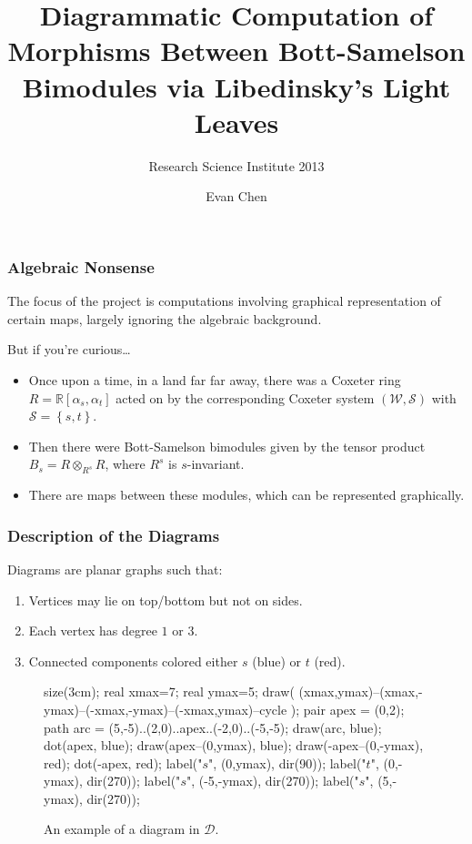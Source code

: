 \documentclass[pdf]{beamer}
\title[Maps in $\mathcal B_{\text{BS}}$]{Diagrammatic Computation of Morphisms Between Bott-Samelson Bimodules via Libedinsky's Light Leaves}
\subtitle[RSI 2013]{Research Science Institute 2013}
\author{Evan Chen}
\def\RR{\mathbb R}
\def\ZZ{\mathbb Z}
\def\ii{\item}
\theoremstyle{definition}
\def\DD{\mathcal D}
\begin{document}
\begin{frame}
	\maketitle
\end{frame}

\begin{frame}
	\frametitle{Algebraic Nonsense}
	The focus of the project is computations involving graphical representation of certain maps, largely \alert{ignoring the algebraic background}.
	\par
	But if you're curious\dots
	\begin{itemize}
		\ii Once upon a time, in a land far far away, there was a Coxeter ring $R = \RR[\alpha_s, \alpha_t]$ acted on by the corresponding Coxeter system $(\mathcal W, \mathcal S)$ with $\mathcal S = \left\{ s,t \right\}$.
		\ii Then there were Bott-Samelson bimodules given by the tensor product $B_s = R \otimes_{R^s} R$, where $R^s$ is $s$-invariant.
		\ii There are maps between these modules, which can be represented graphically.
	\end{itemize}
\end{frame}

\begin{frame}[fragile]
	\frametitle{Description of the Diagrams}

	Diagrams are \alert{planar graphs} such that:
	\begin{enumerate}
		\ii Vertices may lie on top/bottom but not on sides.
		\ii Each vertex has degree $1$ or $3$.
		\ii Connected components colored either $s$ (blue) or $t$ (red).
	\end{enumerate}
	\begin{figure}[ht]
		\centering
		\begin{asy}
		size(3cm);
		real xmax=7;
		real ymax=5;
		draw( (xmax,ymax)--(xmax,-ymax)--(-xmax,-ymax)--(-xmax,ymax)--cycle );
		pair apex = (0,2);
		path arc = (5,-5)..(2,0)..apex..(-2,0)..(-5,-5);
		draw(arc, blue);
		dot(apex, blue);
		draw(apex--(0,ymax), blue);
		draw(-apex--(0,-ymax), red);
		dot(-apex, red);
		label("$s$", (0,ymax), dir(90));
		label("$t$", (0,-ymax), dir(270));
		label("$s$", (-5,-ymax), dir(270));
		label("$s$", (5,-ymax), dir(270));
		\end{asy}
		\caption{An example of a diagram in $\DD$.}
	\end{figure}
\end{frame}
\end{document}
